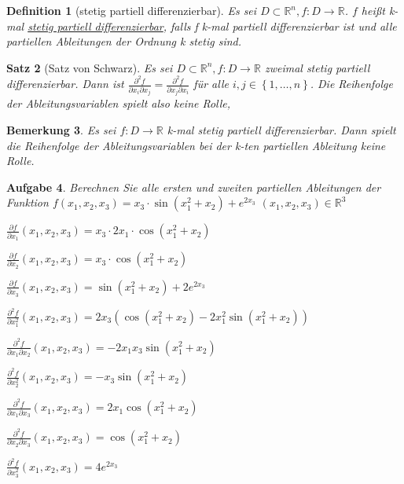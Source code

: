 \documentclass[12pt,a4paper]{scrreprt}
\newtheorem{defi}{Definition}[section]
\newtheorem{bemerkung}[defi]{Bemerkung}
\newtheorem{satz}[defi]{Satz}
\newtheorem{aufg}[defi]{Aufgabe}
\begin{document}
\begin{defi}[stetig partiell differenzierbar]
	Es sei $D\subset\mathbb{R}^n,f:D\to\mathbb{R}$. $f$ heißt k-mal \underline{stetig partiell differenzierbar}, falls f k-mal partiell differenzierbar ist und alle partiellen Ableitungen der Ordnung k stetig sind.
\end{defi}

\begin{satz}[Satz von Schwarz]
	Es sei $D\subset\mathbb{R}^n,f:D\to\mathbb{R}$ zweimal stetig partiell differenzierbar. Dann ist $\frac{\partial^2 f}{\partial x_i \partial x_j}=\frac{\partial^2 f}{\partial x_j \partial x_i}$ für alle $i,j\in\left\{1,\dots,n\right\}$. Die Reihenfolge der Ableitungsvariablen spielt also keine Rolle,
\end{satz}

\begin{bemerkung}
	Es sei $f:D\to\mathbb{R}$ k-mal stetig partiell differenzierbar. Dann spielt die Reihenfolge der Ableitungsvariablen bei der k-ten partiellen Ableitung keine Rolle.
\end{bemerkung}

\begin{aufg}
	Berechnen Sie alle ersten und zweiten partiellen Ableitungen der Funktion $f(x_1,x_2,x_3)=x_3 \cdot \sin(x_1^2+x_2)+e^{2x_3}$ $(x_1,x_2,x_3)\in\mathbb{R}^3$

	\(\frac{\partial f}{\partial x_1}(x_1,x_2,x_3) = x_3 \cdot 2x_1 \cdot \cos(x_1^2+x_2)\)

	\(\frac{\partial f}{\partial x_2}(x_1,x_2,x_3) = x_3 \cdot \cos(x_1^2+x_2)\)

	\(\frac{\partial f}{\partial x_3}(x_1,x_2,x_3) = \sin(x_1^2+x_2) + 2e^{2x_3}\)

	\(\frac{\partial^2 f}{\partial x_1^2}(x_1,x_2,x_3) = 2x_3 \left(\cos(x_1^2+x_2) - 2x_1^2\sin(x_1^2+x_2)\right)\)

	\(\frac{\partial^2 f}{\partial x_1 \partial x_2}(x_1,x_2,x_3) = -2x_1x_3 \sin(x_1^2+x_2)\)

	\(\frac{\partial^2 f}{\partial x_2^2}(x_1,x_2,x_3) = -x_3\sin(x_1^2+x_2)\)

	\(\frac{\partial^2 f}{\partial x_1 \partial x_3}(x_1,x_2,x_3) = 2x_1 \cos(x_1^2+x_2)\)

	\(\frac{\partial^2 f}{\partial x_2 \partial x_3}(x_1,x_2,x_3) = \cos(x_1^2+x_2)\)

	\(\frac{\partial^2 f}{\partial x_3^2}(x_1,x_2,x_3) = 4e^{2x_3}\)
\end{aufg}
\end{document}
